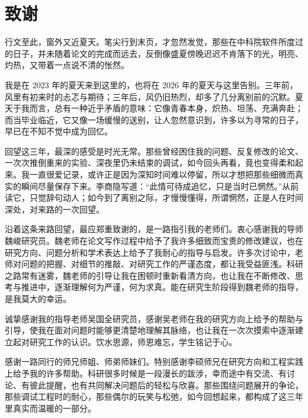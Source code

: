 \chapter[致谢]{致\quad 谢}%

行文至此，窗外又近夏天。笔尖行到末页，才忽然发觉，那些在中科院软件所度过的日子，并未随着论文的完成而远去，反倒像盛夏傍晚迟迟不肯落下的光，明亮、灼热，又带着一点说不清的怅然。

我是在 2023 年的夏天来到这里的，也将在 2026 年的夏天与这里告别。三年前，风里有初来时的忐忑与期待；三年后，风仍旧热烈，却多了几分离别前的沉默。夏天于我而言，总有一种近乎矛盾的意味：它像青春本身，炽热、坦荡、充满奔赴；而当毕业临近，它又像一场缓慢的送别，让人忽然意识到，许多以为寻常的日子，早已在不知不觉中成为回忆。

回望这三年，最深的感受是时光无常。那些曾经困住我的问题、反复修改的论文、一次次推倒重来的实验、深夜里仍未结束的调试，如今回头再看，竟也变得柔和起来。我一直很爱记录，或许正是因为深知时间难以停留，所以才想把那些细微而真实的瞬间尽量保存下来。李商隐写道：“此情可待成追忆，只是当时已惘然。”从前读它，只觉辞句动人；如今到了离别之际，才慢慢懂得，所谓惘然，正是人在时间深处，对来路的一次回望。

沿着这条来路回望，最应郑重致谢的，是一路指引我的老师们。衷心感谢我的导师魏峻研究员。魏老师在论文写作过程中给予了我许多细致而宝贵的修改建议，也在研究方向、问题分析和学术表达上给予了我耐心的指导与启发。许多次讨论中，老师对问题的把握、对细节的推敲、对研究工作的严谨态度，都让我受益匪浅。科研之路常有迷雾，魏老师的引导让我在困顿时重新看清方向，也让我在不断修改、思考与推进中，逐渐理解何为严谨，何为求真。能在研究生阶段得到魏老师的指导，是我莫大的幸运。

诚挚感谢我的指导老师吴国全研究员，感谢吴老师在我的研究方向上给予的帮助与引导，使我在面对问题时能够更清楚地理解其脉络，也让我在一次次摸索中逐渐建立起对研究工作的认识。饮水思源，师恩难忘，学生铭记于心。

感谢一路同行的师兄师姐、师弟师妹们。特别感谢李硕师兄在研究方向和工程实践上给予我的许多帮助。科研很多时候是一段漫长的跋涉，幸而途中有交流、有讨论、有彼此提醒，也有共同解决问题后的轻松与欣喜。那些围绕问题展开的争论，那些调试工程时的耐心，那些偶尔的玩笑与松弛，如今回想起来，都构成了这三年里真实而温暖的一部分。

